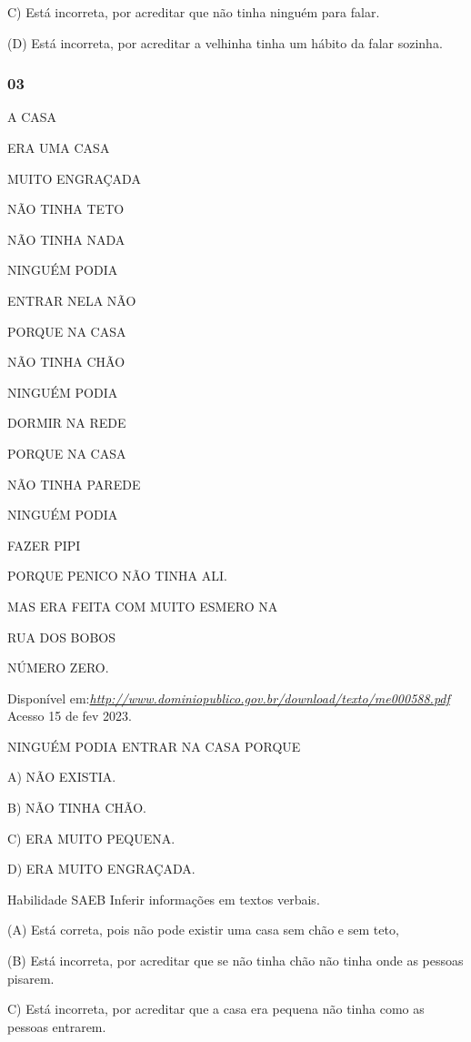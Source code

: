 C) Está incorreta, por acreditar que não tinha ninguém para falar.

(D) Está incorreta, por acreditar a velhinha tinha um hábito da falar
sozinha.

\subsubsection{03}\label{section-22}

A CASA

ERA UMA CASA

MUITO ENGRAÇADA

NÃO TINHA TETO

NÃO TINHA NADA

NINGUÉM PODIA

ENTRAR NELA NÃO

PORQUE NA CASA

NÃO TINHA CHÃO

NINGUÉM PODIA

DORMIR NA REDE

PORQUE NA CASA

NÃO TINHA PAREDE

NINGUÉM PODIA

FAZER PIPI

PORQUE PENICO NÃO TINHA ALI.

MAS ERA FEITA COM MUITO ESMERO NA

RUA DOS BOBOS

NÚMERO ZERO.

Disponível
em:\href{http://www.dominiopublico.gov.br/download/texto/me000588.pdf}{\emph{http://www.dominiopublico.gov.br/download/texto/me000588.pdf}}
Acesso 15 de fev 2023.

NINGUÉM PODIA ENTRAR NA CASA PORQUE

A) NÃO EXISTIA.

B) NÃO TINHA CHÃO.

C) ERA MUITO PEQUENA.

D) ERA MUITO ENGRAÇADA.

\protect\hypertarget{_heading=h.2p2csry}{}{}Habilidade SAEB Inferir
informações em textos verbais.

(A) Está correta, pois não pode existir uma casa sem chão e sem teto,

(B) Está incorreta, por acreditar que se não tinha chão não tinha onde
as pessoas pisarem.

C) Está incorreta, por acreditar que a casa era pequena não tinha como
as pessoas entrarem.

